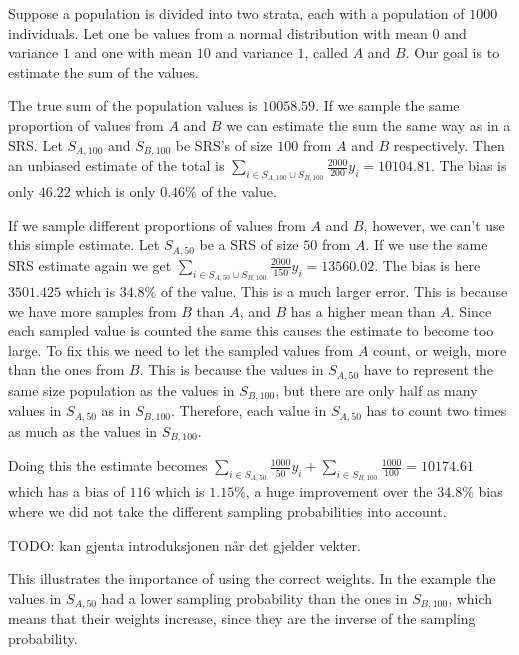 \documentclass{article}
\begin{document}
\begin{example}
  Suppose a population is divided into two strata, each with a population of
  \(1000\) individuals. Let one be values from a normal distribution with mean
  \(0\) and variance \(1\) and one with mean \(10\) and variance \(1\), called
  \(A\) and \(B\).
  Our goal is to estimate the sum of the values.

  The true sum of the population values is \(10058.59\). If we sample the same
  proportion of values from \(A\) and \(B\) we can estimate the sum the same way
  as in a SRS. Let \(S_{A, 100}\) and
  \(S_{B, 100}\) be SRS's of size \(100\) from \(A\) and \(B\) respectively.
  Then an unbiased estimate of the total is \(\sum_{i \in S_{A, 100} \cup S_{B,
      100} } \frac{2000}{200} y_i = 10104.81\). The bias is only \(46.22\) which is only \(0.46\%\) of the
  value.

  If we sample different proportions of values from \(A\) and \(B\), however, we
  can't use this simple estimate. Let \(S_{A, 50}\) be a SRS of size \(50\)
  from \(A\). If we use the same SRS estimate again we get \(\sum_{i \in S_{A, 50} \cup S_{B,
      100}} \frac{2000}{150} y_i = 13560.02\). The bias is here \(3501.425\) which is \(34.8\%\) of the
  value. This is a much larger error. This is because we have more samples from
  \(B\) than \(A\), and \(B\) has a higher mean than \(A\). Since each sampled
  value is counted the same this causes the estimate to become too large. To fix
  this we need to let the sampled values from \(A\) count, or weigh, more than
  the ones from \(B\). This is because the values in \(S_{A, 50}\) have to
  represent the same size population as the values in \(S_{B, 100}\), but there
  are only half as many values in \(S_{A, 50}\) as in \(S_{B, 100}\). Therefore,
  each value in \(S_{A, 50}\) has to count two times as much as the values in \(S_{B, 100}\).

  Doing this the estimate becomes \(\sum_{i
    \in S_{A, 50}} \frac{1000}{50} y_i + \sum_{i \in S_{B, 100}}
  \frac{1000}{100} = 10174.61\) which has a bias of \(116\) which is \(1.15\%\),
  a huge improvement over the \(34.8\%\) bias where we did not take the
  different sampling probabilities into account.
\end{example}

TODO: kan gjenta introduksjonen når det gjelder vekter.

This illustrates the importance of using the correct weights. In the example the
values in \(S_{A, 50}\) had a lower sampling probability than the ones in
\(S_{B, 100}\), which means that their weights increase, since they are the
inverse of the sampling probability.
\end{document}
